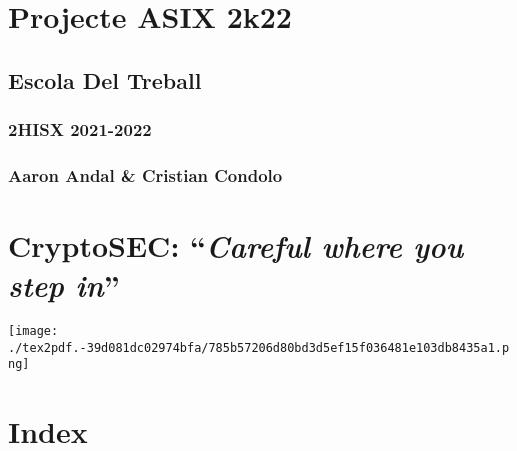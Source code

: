 \documentclass[]{article}
\date{}
\begin{document}
\hypertarget{projecte-asix-2k22}{%
\section{\texorpdfstring{\textbf{Projecte ASIX
2k22}}{Projecte ASIX 2k22}}\label{projecte-asix-2k22}}

\hypertarget{escola-del-treball}{%
\subsection{\texorpdfstring{\textbf{Escola Del
Treball}}{Escola Del Treball}}\label{escola-del-treball}}

\hypertarget{hisx-2021-2022}{%
\subsubsection{\texorpdfstring{\textbf{2HISX
2021-2022}}{2HISX 2021-2022}}\label{hisx-2021-2022}}

\hypertarget{aaron-andal-cristian-condolo}{%
\subsubsection{\texorpdfstring{\textbf{Aaron Andal \& Cristian
Condolo}}{Aaron Andal \& Cristian Condolo}}\label{aaron-andal-cristian-condolo}}

\hypertarget{cryptosec-careful-where-you-step-in}{%
\section{\texorpdfstring{\textbf{CryptoSEC}: ``\emph{Careful where you
step
in}''}{CryptoSEC: ``Careful where you step in''}}\label{cryptosec-careful-where-you-step-in}}

\texttt{[image: ./tex2pdf.-39d081dc02974bfa/785b57206d80bd3d5ef15f036481e103db8435a1.png]}

\hypertarget{index}{%
\section{\texorpdfstring{\textbf{Index}}{Index}}\label{index}}
\end{document}

